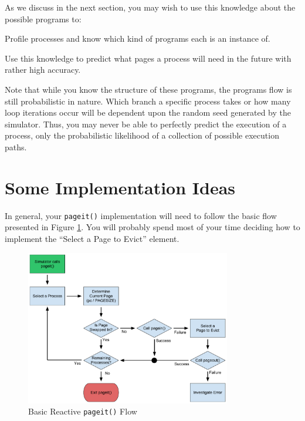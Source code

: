 \documentclass[12pt]{article}
\newenvironment{packed_enum}{
\begin{enumerate}
  \setlength{\itemsep}{1pt}
  \setlength{\parskip}{0pt}
  \setlength{\parsep}{0pt}
}{\end{enumerate}}
\begin{document}
As we discuss in the next section,
you may wish to use this knowledge about the possible programs to:
\begin{packed_enum}
\item Profile processes and know which kind of programs each is an
  instance of.
\item Use this knowledge to predict what pages a process will need
  in the future with rather high accuracy.
\end{packed_enum}

Note that while you know the structure of these programs, the programs
flow is still probabilistic in nature. Which branch a specific process
takes or how many loop iterations occur will be dependent upon the
random seed generated by the simulator. Thus, you may never be able to
perfectly predict the execution of a process, only the probabilistic
likelihood of a collection of possible execution paths.

\section{Some Implementation Ideas}

In general, your \texttt{pageit()} implementation will need to follow
the basic flow presented in Figure \ref{fig:pageit-reactive}. You will
probably spend most of your time deciding how to implement the ``Select
a Page to Evict'' element.

\begin{figure}[htbp]
  \begin{center}
    \includegraphics[width=0.8\textwidth]{pageit-Fig1.pdf}
    \caption{Basic Reactive \texttt{pageit()} Flow}
    \label{fig:pageit-reactive}
  \end{center}
\end{figure}
\end{document}
